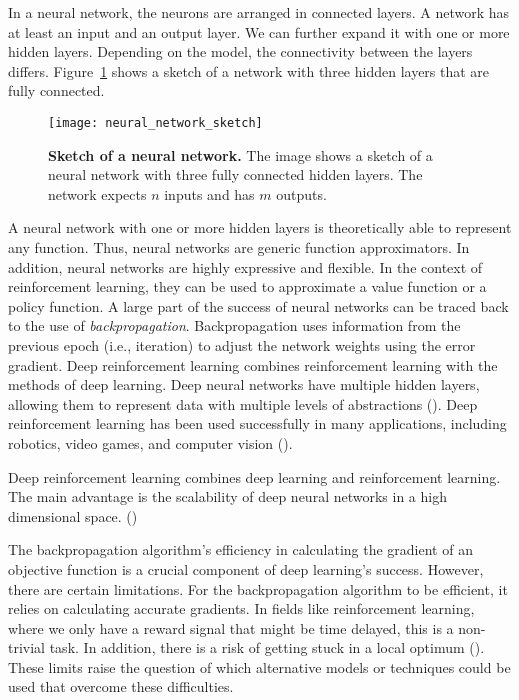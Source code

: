 In a neural network, the neurons are arranged in connected layers. A network has at least an input and an output layer. We can further expand it with one or more hidden layers. Depending on the model, the connectivity between the layers differs. Figure~\ref{fig:neural_network_sketch} shows a sketch of a network with three hidden layers that are fully connected.
\begin{figure}[ht]
\centering
\texttt{[image: neural\_network\_sketch]}
\caption[Sketch of a neural network]{
  \textbf{Sketch of a neural network.}
  The image shows a sketch of a neural network with three fully connected hidden layers. The network expects $n$ inputs and has $m$ outputs.
}
\label{fig:neural_network_sketch}
\end{figure}

A neural network with one or more hidden layers is theoretically able to represent any function. Thus, neural networks are generic function approximators. In addition, neural networks are highly expressive and flexible. In the context of reinforcement learning, they can be used to approximate a value function or a policy function. A large part of the success of neural networks can be traced back to the use of \textit{backpropagation}. Backpropagation uses information from the previous epoch (i.e., iteration) to adjust the network weights using the error gradient. Deep reinforcement learning combines reinforcement learning with the methods of deep learning. Deep neural networks have multiple hidden layers, allowing them to represent data with multiple levels of abstractions (\cite{lecun2015deep}). Deep reinforcement learning has been used successfully in many applications, including robotics, video games, and computer vision (\cite{franccois2018introduction}).

Deep reinforcement learning combines deep learning and reinforcement learning. The main advantage is the scalability of deep neural networks in a high dimensional space. (\cite{dong2020deep})

The backpropagation algorithm's efficiency in calculating the gradient of an objective function is a crucial component of deep learning's success. However, there are certain limitations. For the backpropagation algorithm to be efficient, it relies on calculating accurate gradients. In fields like reinforcement learning, where we only have a reward signal that might be time delayed, this is a non-trivial task. In addition, there is a risk of getting stuck in a local optimum (\cite{ha2017visual}). These limits raise the question of which alternative models or techniques could be used that overcome these difficulties.

